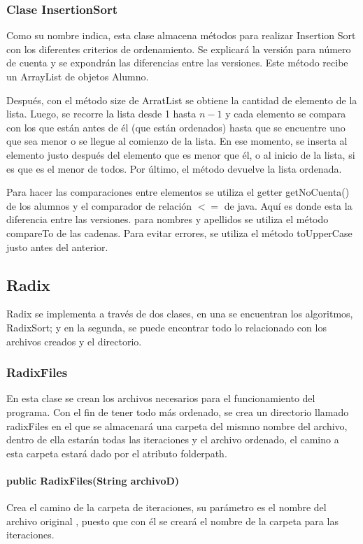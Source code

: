 \documentclass[11pt]{article}
\begin{document}
\subsubsection{Clase InsertionSort}
Como su nombre indica, esta clase almacena métodos para realizar Insertion Sort con los diferentes criterios de ordenamiento. Se explicará la versión para número de cuenta y se expondrán las diferencias entre las versiones. Este método recibe un ArrayList de objetos Alumno. 
\par
Después, con el método size de ArratList se obtiene la cantidad de elemento de la lista. Luego, se recorre la lista desde 1 hasta $n-1$ y cada elemento se compara con los que están antes de él (que están ordenados) hasta que se encuentre uno que sea menor o se llegue al comienzo de la lista. En ese momento, se inserta al elemento justo después del elemento que es menor que él, o al inicio de la lista, si es que es el menor de todos. Por último, el método devuelve la lista ordenada.
\par 
Para hacer las comparaciones entre elementos se utiliza el getter getNoCuenta() de los alumnos y el comparador de relación $<=$ de java. Aquí es donde esta la diferencia entre las versiones. para nombres y apellidos se utiliza el método compareTo de las cadenas. Para evitar errores, se utiliza el método toUpperCase justo antes del anterior.

\subsection{Radix}
Radix se implementa a través de dos clases, en una se encuentran los algoritmos, RadixSort; y en la segunda, se puede encontrar todo lo relacionado con los archivos creados y el directorio. 

\subsubsection{RadixFiles}
En esta clase se crean los archivos necesarios para el funcionamiento del programa. Con el fin de tener todo más ordenado, se crea un directorio llamado radixFiles en el que se almacenará una carpeta del mismno nombre del archivo, dentro de ella estarán todas las iteraciones y el archivo ordenado, el camino a esta carpeta estará dado por el atributo folderpath. 

\paragraph{public RadixFiles(String archivoD)}
Crea el camino de la carpeta de iteraciones, su parámetro es el nombre del archivo original , puesto que con él se creará el nombre de la carpeta para las iteraciones. 
\end{document}
